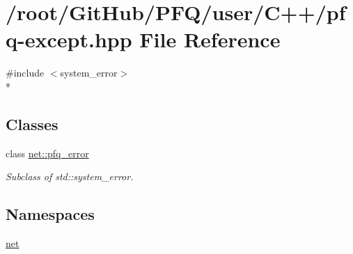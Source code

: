 \hypertarget{pfq-except_8hpp}{\section{/root/\-Git\-Hub/\-P\-F\-Q/user/\-C++/pfq-\/except.hpp File Reference}
\label{pfq-except_8hpp}
}
{\ttfamily \#include $<$system\-\_\-error$>$}\\*
\subsection*{Classes}
\begin{DoxyCompactItemize}
\item 
class \hyperlink{classnet_1_1pfq__error}{net\-::pfq\-\_\-error}
\begin{DoxyCompactList}\small\item\em Subclass of std\-::system\-\_\-error. \end{DoxyCompactList}\end{DoxyCompactItemize}
\subsection*{Namespaces}
\begin{DoxyCompactItemize}
\item 
\hyperlink{namespacenet}{net}
\end{DoxyCompactItemize}
